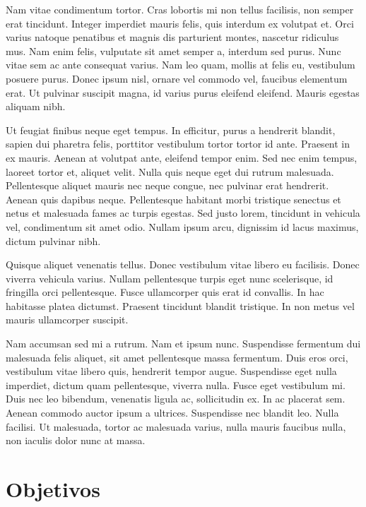 Nam vitae condimentum tortor. Cras lobortis mi non tellus facilisis, non semper erat tincidunt. Integer imperdiet mauris felis, quis interdum ex volutpat et. Orci varius natoque penatibus et magnis dis parturient montes, nascetur ridiculus mus. Nam enim felis, vulputate sit amet semper a, interdum sed purus. Nunc vitae sem ac ante consequat varius. Nam leo quam, mollis at felis eu, vestibulum posuere purus. Donec ipsum nisl, ornare vel commodo vel, faucibus elementum erat. Ut pulvinar suscipit magna, id varius purus eleifend eleifend. Mauris egestas aliquam nibh.

Ut feugiat finibus neque eget tempus. In efficitur, purus a hendrerit blandit, sapien dui pharetra felis, porttitor vestibulum tortor tortor id ante. Praesent in ex mauris. Aenean at volutpat ante, eleifend tempor enim. Sed nec enim tempus, laoreet tortor et, aliquet velit. Nulla quis neque eget dui rutrum malesuada. Pellentesque aliquet mauris nec neque congue, nec pulvinar erat hendrerit. Aenean quis dapibus neque. Pellentesque habitant morbi tristique senectus et netus et malesuada fames ac turpis egestas. Sed justo lorem, tincidunt in vehicula vel, condimentum sit amet odio. Nullam ipsum arcu, dignissim id lacus maximus, dictum pulvinar nibh.

Quisque aliquet venenatis tellus. Donec vestibulum vitae libero eu facilisis. Donec viverra vehicula varius. Nullam pellentesque turpis eget nunc scelerisque, id fringilla orci pellentesque. Fusce ullamcorper quis erat id convallis. In hac habitasse platea dictumst. Praesent tincidunt blandit tristique. In non metus vel mauris ullamcorper suscipit.

Nam accumsan sed mi a rutrum. Nam et ipsum nunc. Suspendisse fermentum dui malesuada felis aliquet, sit amet pellentesque massa fermentum. Duis eros orci, vestibulum vitae libero quis, hendrerit tempor augue. Suspendisse eget nulla imperdiet, dictum quam pellentesque, viverra nulla. Fusce eget vestibulum mi. Duis nec leo bibendum, venenatis ligula ac, sollicitudin ex. In ac placerat sem. Aenean commodo auctor ipsum a ultrices. Suspendisse nec blandit leo. Nulla facilisi. Ut malesuada, tortor ac malesuada varius, nulla mauris faucibus nulla, non iaculis dolor nunc at massa.

\section{Objetivos}

